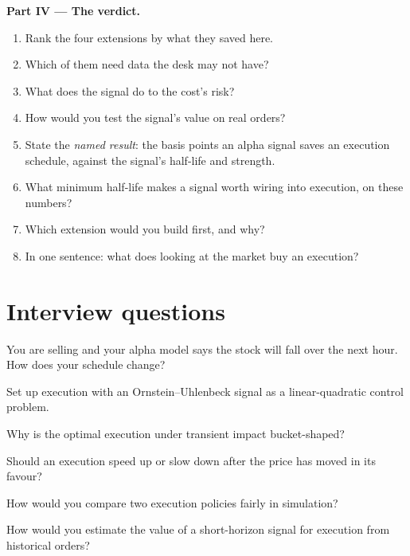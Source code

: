 \begin{problem}
\medskip\noindent\textbf{Part IV --- The verdict.}
\begin{enumerate}[resume]
\item Rank the four extensions by what they saved here.
\item Which of them need data the desk may not have?
\item What does the signal do to the cost's risk?
\item How would you test the signal's value on real orders?
\item State the \emph{named result}: the basis points an alpha signal saves an execution schedule, against the signal's half-life and strength.
\item What minimum half-life makes a signal worth wiring into execution, on these numbers?
\item Which extension would you build first, and why?
\item In one sentence: what does looking at the market buy an execution?
\end{enumerate}
\end{problem}

\section{Interview questions}

\begin{interviewq}\label{iq:mx:beyond-almgren-chriss:1}
You are selling and your alpha model says the stock will fall over the next hour. How does your schedule change?
\end{interviewq}

\begin{interviewq}\label{iq:mx:beyond-almgren-chriss:2}
Set up execution with an Ornstein--Uhlenbeck signal as a linear-quadratic control problem.
\end{interviewq}

\begin{interviewq}\label{iq:mx:beyond-almgren-chriss:3}
Why is the optimal execution under transient impact bucket-shaped?
\end{interviewq}

\begin{interviewq}\label{iq:mx:beyond-almgren-chriss:4}
Should an execution speed up or slow down after the price has moved in its favour?
\end{interviewq}

\begin{interviewq}\label{iq:mx:beyond-almgren-chriss:5}
How would you compare two execution policies fairly in simulation?
\end{interviewq}

\begin{interviewq}\label{iq:mx:beyond-almgren-chriss:6}
How would you estimate the value of a short-horizon signal for execution from historical orders?
\end{interviewq}
